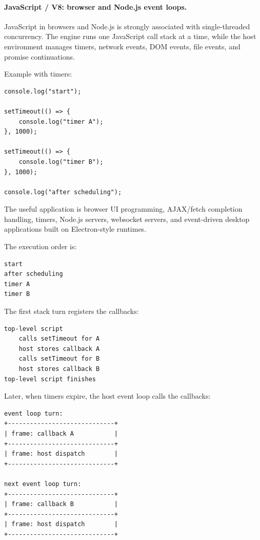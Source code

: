 \paragraph{JavaScript / V8: browser and Node.js event loops.}

JavaScript in browsers and Node.js is strongly associated with single-threaded concurrency. The engine runs one JavaScript call stack at a time, while the host environment manages timers, network events, DOM events, file events, and promise continuations.

Example with timers:

\begin{verbatim}
console.log("start");

setTimeout(() => {
    console.log("timer A");
}, 1000);

setTimeout(() => {
    console.log("timer B");
}, 1000);

console.log("after scheduling");
\end{verbatim}

The useful application is browser UI programming, AJAX/fetch completion handling, timers, Node.js servers, websocket servers, and event-driven desktop applications built on Electron-style runtimes.

The execution order is:

\begin{verbatim}
start
after scheduling
timer A
timer B
\end{verbatim}

The first stack turn registers the callbacks:

\begin{verbatim}
top-level script
    calls setTimeout for A
    host stores callback A
    calls setTimeout for B
    host stores callback B
top-level script finishes
\end{verbatim}

Later, when timers expire, the host event loop calls the callbacks:

\begin{verbatim}
event loop turn:
+-----------------------------+
| frame: callback A           |
+-----------------------------+
| frame: host dispatch        |
+-----------------------------+

next event loop turn:
+-----------------------------+
| frame: callback B           |
+-----------------------------+
| frame: host dispatch        |
+-----------------------------+
\end{verbatim}

